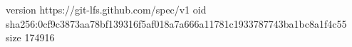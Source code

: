 version https://git-lfs.github.com/spec/v1
oid sha256:0cf9c3873aa78bf139316f5af018a7a666a11781c1933787743ba1bc8a1f4c55
size 174916
